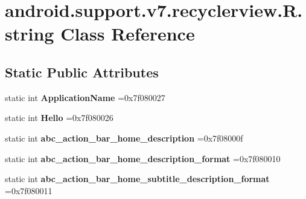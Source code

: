 \hypertarget{classandroid_1_1support_1_1v7_1_1recyclerview_1_1R_1_1string}{}\section{android.\+support.\+v7.\+recyclerview.\+R.\+string Class Reference}
\label{classandroid_1_1support_1_1v7_1_1recyclerview_1_1R_1_1string}
\subsection*{Static Public Attributes}
\begin{DoxyCompactItemize}
\item 
\mbox{\label{classandroid_1_1support_1_1v7_1_1recyclerview_1_1R_1_1string_ae615b7ceb172a92a5a0cf7c24d732027}} 
static int {\bfseries Application\+Name} =0x7f080027
\item 
\mbox{\label{classandroid_1_1support_1_1v7_1_1recyclerview_1_1R_1_1string_ad0be5e3da052d5fae7ccd56afc54e7a1}} 
static int {\bfseries Hello} =0x7f080026
\item 
\mbox{\label{classandroid_1_1support_1_1v7_1_1recyclerview_1_1R_1_1string_ae8a525910319d50de71ec49455ddc3a0}} 
static int {\bfseries abc\+\_\+action\+\_\+bar\+\_\+home\+\_\+description} =0x7f08000f
\item 
\mbox{\label{classandroid_1_1support_1_1v7_1_1recyclerview_1_1R_1_1string_a20b67a374c94df765fbd5c6406e42a5c}} 
static int {\bfseries abc\+\_\+action\+\_\+bar\+\_\+home\+\_\+description\+\_\+format} =0x7f080010
\item 
\mbox{\label{classandroid_1_1support_1_1v7_1_1recyclerview_1_1R_1_1string_ac31ccbfa5f5f960ae1c83c20b74b1deb}} 
static int {\bfseries abc\+\_\+action\+\_\+bar\+\_\+home\+\_\+subtitle\+\_\+description\+\_\+format} =0x7f080011
\item 
\mbox{\label{classandroid_1_1support_1_1v7_1_1recyclerview_1_1R_1_1string_a4492ba61d98fcdab3121d3bc978a3eb6}} 

\end{DoxyCompactItemize}

